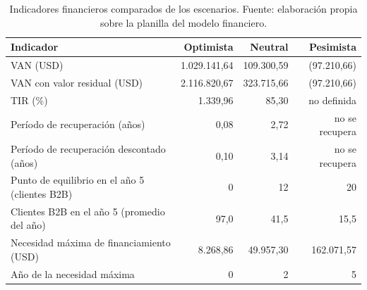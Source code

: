 \begin{table}[t]
  \centering
  \small
  \caption{Indicadores financieros comparados de los escenarios. Fuente: elaboración propia sobre la planilla del modelo financiero.}
  \label{tab:financiero-comparada}
  \begin{tabular}{l r r r}
    \hline
    \textbf{Indicador} & \textbf{Optimista} & \textbf{Neutral} & \textbf{Pesimista} \\
    \hline
    VAN (USD) & 1.029.141,64 & 109.300,59 & (97.210,66) \\
    VAN con valor residual (USD) & 2.116.820,67 & 323.715,66 & (97.210,66) \\
    TIR (\%) & 1.339,96 & 85,30 & no definida \\
    Período de recuperación (años) & 0,08 & 2,72 & no se recupera \\
    Período de recuperación descontado (años) & 0,10 & 3,14 & no se recupera \\
    Punto de equilibrio en el año 5 (clientes B2B) & 0 & 12 & 20 \\
    Clientes B2B en el año 5 (promedio del año) & 97,0 & 41,5 & 15,5 \\
    Necesidad máxima de financiamiento (USD) & 8.268,86 & 49.957,30 & 162.071,57 \\
    Año de la necesidad máxima & 0 & 2 & 5 \\
    \hline
  \end{tabular}
\end{table}
